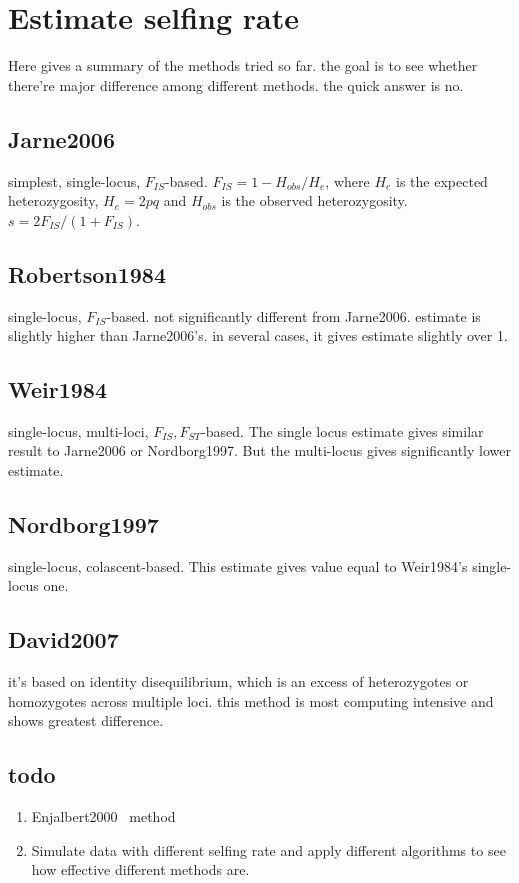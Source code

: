 \documentclass[a4paper,10pt]{article}
\begin{document}
\section{Estimate selfing rate}
Here gives a summary of the methods tried so far. the goal is to see whether there're major difference among different methods. the quick answer is no.

\subsection{Jarne2006~\cite{Jarne2006}}
simplest, single-locus, $F_{IS}$-based. $F_{IS} = 1-H_{obs}/H_e$, where $H_e$ is the expected heterozygosity, $H_e = 2pq$ and $H_{obs}$ is the observed heterozygosity. $s = 2F_{IS}/(1+F_{IS})$.

\subsection{Robertson1984~\cite{Robertson1984}}
single-locus, $F_{IS}$-based. not significantly different from Jarne2006. estimate is slightly higher than Jarne2006's. in several cases, it gives estimate slightly over 1.

\subsection{Weir1984~\cite{Weir1984}}
single-locus, multi-loci, $F_{IS},F_{ST}$-based. The single locus estimate gives similar result to Jarne2006 or Nordborg1997. But the multi-locus gives significantly lower estimate.

\subsection{Nordborg1997~\cite{Nordborg1997}}
single-locus, colascent-based. This estimate gives value equal to Weir1984's single-locus one.

\subsection{David2007~\cite{David2007}}
it's based on identity disequilibrium, which is an excess of heterozygotes or homozygotes across multiple loci. this method is most computing intensive and shows greatest difference.

\subsection{todo}
\begin{enumerate}
 \item Enjalbert2000~\cite{Enjalbert2000} method
 \item Simulate data with different selfing rate and apply different algorithms to see how effective different methods are.
\end{enumerate}
\end{document}

